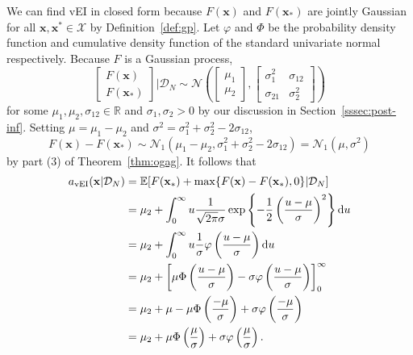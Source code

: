 We can find vEI in closed form because $F(\mathbf{x})$ and $F(\mathbf{x}_*)$ are jointly Gaussian for all $\mathbf{x}, \mathbf{x}^{*} \in \mathcal{X}$
by Definition~\ref{def:gp}.
Let $\varphi$ and $\Phi$ be the probability density function and cumulative density function of the standard univariate normal respectively.
Because $F$ is a Gaussian process,
\begin{equation*}
    \begin{bmatrix}
        F(\mathbf{x}) \\
        F(\mathbf{x}_*)
    \end{bmatrix}
    \bigg| \mathcal{D}_N
    \sim \mathcal{N}\left(
    \begin{bmatrix}
            \mu_1 \\
            \mu_2
        \end{bmatrix}
    ,
    \begin{bmatrix}
            \sigma_{1}^2 & \sigma_{12} \\
            \sigma_{21} & \sigma^2_2
        \end{bmatrix}
    \right)
\end{equation*}
for some $\mu_1, \mu_2, \sigma_{12} \in \mathbb{R}$ and $\sigma_1, \sigma_2 > 0$ by our discussion in Section~\ref{sssec:post-inf}.
Setting $\mu = \mu_1 - \mu_2$ and $\sigma^2 = \sigma_1^2 + \sigma_2^2 - 2 \sigma_{12}$,
\begin{equation*}
    F(\mathbf{x}) - F\left(\mathbf{x}_*\right) \sim \mathcal{N}_1(\mu_1 - \mu_2, \sigma_1^2 + \sigma_2^2 - 2\sigma_{12}) = \mathcal{N}_1\left(\mu, \sigma^2\right)
\end{equation*}
by part (3) of Theorem~\ref{thm:ogag}.
It follows that
\begin{align*}
    a_{\mathrm{vEI}}(\mathbf{x} | \mathcal{D}_N)
    & =  \mathbb{E}[F(\mathbf{x}_*) + \max \{  F(\mathbf{x}) - F(\mathbf{x}_*), 0 \} | \mathcal{D}_N] \\
    & = \mu_2 + \int_{0}^\infty u \frac{ 1 }{ \sqrt{2 \pi } \sigma} \exp \left\{ -\frac12 \left(\frac{ u - \mu }{ \sigma }\right)^2 \right\} \mathrm{d} u \\
    & = \mu_2 + \int_{0}^\infty u \frac{ 1 }{ \sigma } \varphi\left(\frac{ u - \mu }{ \sigma }\right) \mathrm{d} u \\
    & = \mu_2 + \left[ \mu \Phi\left(\frac{ u - \mu }{ \sigma }\right) - \sigma \varphi\left(\frac{ u - \mu }{ \sigma }\right)\right]_{0}^{\infty} \\
    & = \mu_2 +  \mu - \mu \Phi\left(\frac{ -\mu }{ \sigma }\right) + \sigma \varphi\left(\frac{ -\mu }{ \sigma }\right) \\
    & = \mu_2 + \mu \Phi\left(\frac{ \mu }{ \sigma }\right) + \sigma \varphi\left(\frac{ \mu }{ \sigma }\right).
\end{align*}
